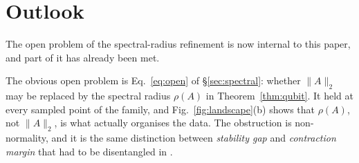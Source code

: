 \documentclass[11pt,a4paper]{article}
\theoremstyle{definition}
\theoremstyle{remark}
\begin{document}
\section{Outlook}\label{sec:outlook}

The open problem of the spectral-radius refinement is now internal to this
paper, and part of it has already been met.

The obvious open problem is Eq.~\eqref{eq:open} of \S\ref{sec:spectral}: whether $\|A\|_{2}$ may be
replaced by the spectral radius $\rho(A)$ in Theorem~\ref{thm:qubit}. It held
at every sampled point of the family, and Fig.~\ref{fig:landscape}(b) shows
that $\rho(A)$, not $\|A\|_{2}$, is what actually organises the data. The
obstruction is non-normality, and it is the same distinction between
\emph{stability gap} and \emph{contraction margin} that had to be disentangled
in \cite[Sec.~II\,B]{PaperI}.
\end{document}
